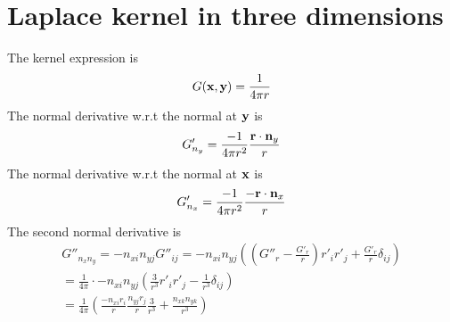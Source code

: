 \section{Laplace kernel in three dimensions}

The kernel expression is
%
\begin{equation}
	G({\bf x}, {\bf y}) = \frac{1}{4\pi r}
\end{equation}
%
The normal derivative w.r.t the normal at ${\bf y}$ is
%
\begin{equation}
	G'_{n_y} = \frac{-1}{4\pi r^2} \frac{{\bf r} \cdot {\bf n}_y}{r}
\end{equation}
%
The normal derivative w.r.t the normal at ${\bf x}$ is
%
\begin{equation}
	G'_{n_x} = \frac{-1}{4\pi r^2} \frac{-{\bf r} \cdot {\bf n}_x}{r}
\end{equation}
%
The second normal derivative is
%
\begin{multline}
	G''_{n_x n_y} = -n_{xi} n_{yj} G''_{ij}
	=-n_{xi} n_{yj} \left( \left(G''_r - \frac{G'_r}{r} \right) r'_i r'_j +  \frac{G'_r}{r} \delta_{ij} \right) \\
	=\frac{1}{4\pi} \cdot -n_{xi} n_{yj} \left( \frac{3}{r^3} r'_i r'_j - \frac{1}{r^3} \delta_{ij} \right)
	\\
	=\frac{1}{4\pi} \left(
		\frac{-n_{xi} r_i}{r} \frac{n_{yj} r_j}{r} \frac{3}{r^3}
		+
		\frac{n_{xk} n_{yk}}{r^3}
	\right)
\end{multline}

